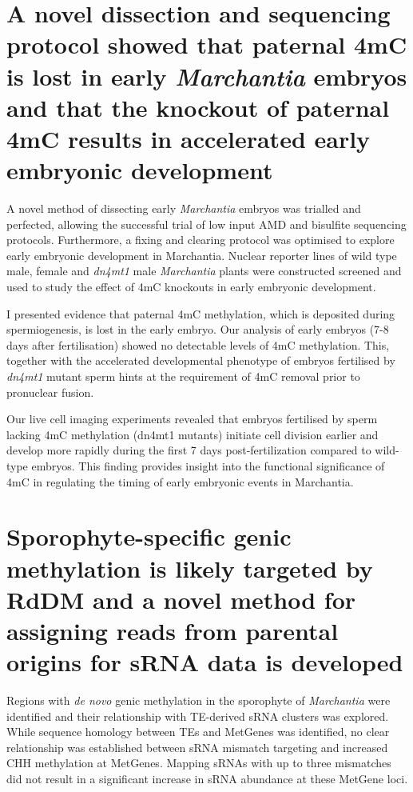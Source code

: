 \section{A novel dissection and sequencing protocol showed that paternal 4mC is lost in early \textit{Marchantia} embryos and that the knockout of paternal 4mC results in accelerated early embryonic development}

A novel method of dissecting early \textit{Marchantia} embryos was trialled and perfected, allowing the successful trial of low input AMD and bisulfite sequencing protocols. Furthermore, a fixing and clearing protocol was optimised to explore early embryonic development in Marchantia. Nuclear reporter lines of wild type male, female and \textit{dn4mt1} male \textit{Marchantia} plants were constructed screened and used to study the effect of 4mC knockouts in early embryonic development.

I presented evidence that  paternal 4mC methylation, which is deposited during spermiogenesis, is lost in the early embryo. Our analysis of early embryos (7-8 days after fertilisation) showed no detectable levels of 4mC methylation. This, together with the accelerated developmental phenotype of embryos fertilised by \textit{dn4mt1} mutant sperm hints at the requirement of 4mC removal prior to pronuclear fusion.

Our live cell imaging experiments revealed that embryos fertilised by sperm lacking 4mC methylation (dn4mt1 mutants) initiate cell division earlier and develop more rapidly during the first 7 days post-fertilization compared to wild-type embryos. This finding provides insight into the functional significance of 4mC in regulating the timing of early embryonic events in Marchantia.

\section{Sporophyte-specific genic methylation is likely targeted by RdDM and a novel method for assigning reads from parental origins for sRNA data is developed}

Regions with \textit{de novo} genic methylation in the sporophyte of \textit{Marchantia} were identified and their relationship with TE-derived sRNA clusters was explored. While sequence homology between TEs and MetGenes was identified, no clear relationship was established between sRNA mismatch targeting and increased CHH methylation at MetGenes. Mapping sRNAs with up to three mismatches did not result in a significant increase in sRNA abundance at these MetGene loci.

